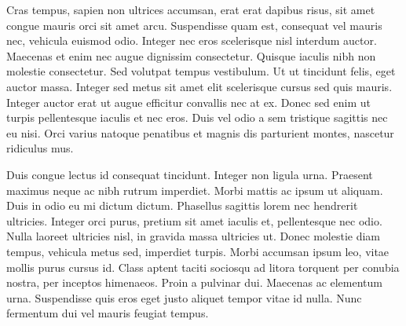 Cras tempus, sapien non ultrices accumsan, erat erat dapibus risus, sit amet congue mauris orci sit amet arcu. Suspendisse quam est, consequat vel mauris nec, vehicula euismod odio. Integer nec eros scelerisque nisl interdum auctor. Maecenas et enim nec augue dignissim consectetur. Quisque iaculis nibh non molestie consectetur. Sed volutpat tempus vestibulum. Ut ut tincidunt felis, eget auctor massa. Integer sed metus sit amet elit scelerisque cursus sed quis mauris. Integer auctor erat ut augue efficitur convallis nec at ex. Donec sed enim ut turpis pellentesque iaculis et nec eros. Duis vel odio a sem tristique sagittis nec eu nisi. Orci varius natoque penatibus et magnis dis parturient montes, nascetur ridiculus mus.


Duis congue lectus id consequat tincidunt. Integer non ligula urna. Praesent maximus neque ac nibh rutrum imperdiet. Morbi mattis ac ipsum ut aliquam. Duis in odio eu mi dictum dictum. Phasellus sagittis lorem nec hendrerit ultricies. Integer orci purus, pretium sit amet iaculis et, pellentesque nec odio. Nulla laoreet ultricies nisl, in gravida massa ultricies ut. Donec molestie diam tempus, vehicula metus sed, imperdiet turpis. Morbi accumsan ipsum leo, vitae mollis purus cursus id. Class aptent taciti sociosqu ad litora torquent per conubia nostra, per inceptos himenaeos. Proin a pulvinar dui. Maecenas ac elementum urna. Suspendisse quis eros eget justo aliquet tempor vitae id nulla. Nunc fermentum dui vel mauris feugiat tempus.
